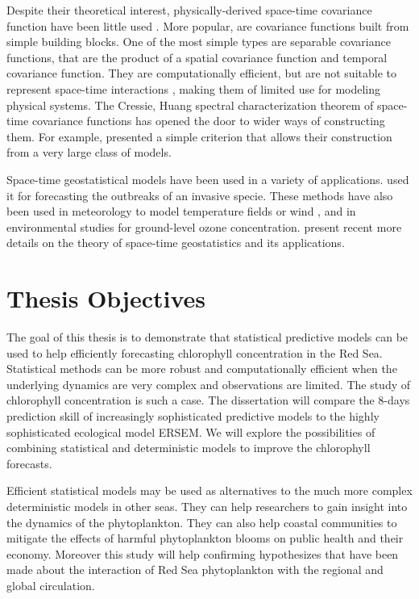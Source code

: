 Despite their theoretical interest, physically-derived space-time covariance function have been little used \citep{Gneiting2010}. More popular, are covariance functions built from simple building blocks. One of the most simple types are separable covariance functions, that are the product of a spatial covariance function and temporal covariance function. They are computationally efficient, but are not suitable to represent space-time interactions \citep{Cressie1999, Stein2005}, making them of limited use for modeling physical systems. The Cressie, Huang spectral characterization theorem of space-time covariance functions has opened the door to wider ways of constructing them. For example, \citet{Gneiting2002} presented a simple criterion that allows their construction from a very large class of models. 

Space-time geostatistical models have been used in a variety of applications. \citet{Hohn1993} used it for forecasting the outbreaks of an invasive specie. These methods have also been used in meteorology to model temperature fields \citep{Handcock1994, North2011} or wind \citep{Cressie1999, Gneiting2002}, and in environmental studies for ground-level ozone concentration. \citet{Gneiting2007, Gneiting2010} present recent more details on the theory of space-time geostatistics and its applications.

\section{Thesis Objectives}

The goal of this thesis is to demonstrate that statistical predictive models can be used to help efficiently forecasting chlorophyll concentration in the Red Sea. Statistical methods can be more robust and computationally efficient when the underlying dynamics are very complex and observations are limited. The study of chlorophyll concentration is such a case. The dissertation will compare the 8-days prediction skill of increasingly sophisticated predictive models to the highly sophisticated ecological model ERSEM. We will explore the possibilities of combining statistical and deterministic models to improve the chlorophyll forecasts.

Efficient statistical models may be used as alternatives to the much more complex deterministic models in other seas. They can help researchers to gain insight into the dynamics of the phytoplankton. They can also help coastal communities to mitigate the effects of harmful phytoplankton blooms on public health and their economy. Moreover this study will help confirming hypothesizes that have been made about the interaction of Red Sea phytoplankton with the regional and global circulation. 

